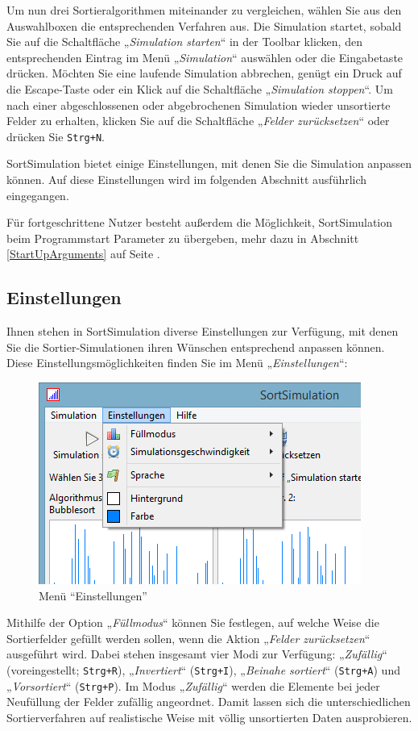 \documentclass[german]{pfBook}
\begin{document}
	Um nun drei Sortieralgorithmen miteinander zu vergleichen, wählen Sie aus den Auswahlboxen die entsprechenden Verfahren aus. Die Simulation startet, sobald Sie auf die Schaltfläche „\emph{Simulation starten}“ in der Toolbar klicken, den entsprechenden Eintrag im Menü „\emph{Simulation}“ auswählen oder die Eingabetaste drücken. Möchten Sie eine laufende Simulation abbrechen, genügt ein Druck auf die Escape-Taste oder ein Klick auf die Schaltfläche „\emph{Simulation stoppen}“. Um nach einer abgeschlossenen oder abgebrochenen Simulation wieder unsortierte Felder zu erhalten, klicken Sie auf die Schaltfläche „\emph{Felder zurücksetzen}“ oder drücken Sie \texttt{Strg+N}.
	
	SortSimulation bietet einige Einstellungen, mit denen Sie die Simulation anpassen können. Auf diese Einstellungen wird im folgenden Abschnitt ausführlich eingegangen.
	
	Für fortgeschrittene Nutzer besteht außerdem die Möglichkeit, SortSimulation beim Programmstart Parameter zu übergeben, mehr dazu in Abschnitt \ref{StartUpArguments} auf Seite \pageref{StartUpArguments}.
	
	\subsection{Einstellungen}
	
	Ihnen stehen in SortSimulation diverse Einstellungen zur Verfügung, mit denen Sie die Sortier-Simula\-{}tionen ihren Wünschen entsprechend anpassen können. Diese Ein\-{}stellungs\-{}mög\-{}lich\-{}kei\-{}ten finden Sie im Menü „\emph{Einstellungen}“:
	
	\begin{figure}[h]
		\centering
		\includegraphics[scale=0.6]{images/image1.png}
		\caption{Menü "`Einstellungen"'}
	\end{figure}
	
	Mithilfe der Option „\emph{Füllmodus}“ können Sie festlegen, auf welche Weise die Sortierfelder gefüllt werden sollen, wenn die Aktion „\emph{Felder zurücksetzen}“ ausgeführt wird. Dabei stehen insgesamt vier Modi zur Verfügung: „\emph{Zufällig}“ (voreingestellt; \texttt{Strg+R}), „\emph{Invertiert}“ (\texttt{Strg+I}), „\emph{Beinahe sortiert}“ (\texttt{Strg+A}) und „\emph{Vorsortiert}“ (\texttt{Strg+P}). Im Modus „\emph{Zufällig}“ werden die Elemente bei jeder Neufüllung der Felder zufällig angeordnet. Damit lassen sich die unterschiedlichen Sortierverfahren auf realistische Weise mit völlig unsortierten Daten ausprobieren.
	
\end{document}

